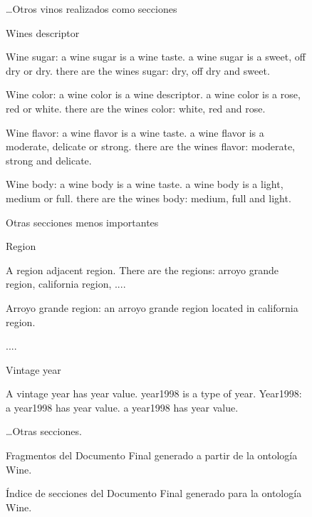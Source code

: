 \begin{figure}
{\begin{minipage}{14cm}
\small{\dots Otros vinos realizados como secciones}

\large{
 Wines descriptor
}

\small{
Wine sugar:	a wine sugar is a wine taste. a wine sugar is a sweet, off dry or dry. there are the wines sugar: dry, off dry and sweet. 

Wine color: a wine color is a wine descriptor. a wine color is a rose, red or white. there are the wines color: white, red and rose. 

Wine flavor: a wine flavor is a wine taste. a wine flavor is a moderate, delicate or strong. there are the wines flavor: moderate, strong and delicate. 

Wine body: a wine body is a wine taste. a wine body is a light, medium or full. there are the wines body: medium, full and light. 
}

\large{
\noindent Otras secciones menos importantes
}

\large{
 Region
}

\small{
A region adjacent region. There are the regions: arroyo grande region, california region, ....

Arroyo grande region: an arroyo grande region located in california region. 

....
}

\large{
 Vintage year
}

\small{
A vintage year has year value. year1998 is a type of year. 
Year1998: a year1998 has year value. a year1998 has year value. 
}

\small{
\dots Otras secciones.
}

\end{minipage}
}
\caption{Fragmentos del Documento Final generado a partir de la ontología Wine.}
\label{fig:doc_final_wine}
\end{figure}


\begin{figure}
\begin{multicols}{2}
{\small
\begin{figure}[H]
\end{figure}}  

\begin{figure}[H]
\end{figure}

\end{multicols}
\caption{Índice de secciones del Documento Final generado para la ontología Wine.}
\label{fig:indice_secciones_wine}
\end{figure}


